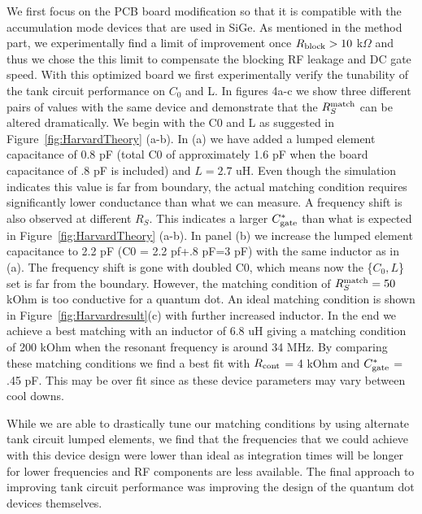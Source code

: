 \documentclass[twocolumn]{article}
\begin{document}
	We first focus on the PCB board modification so that it is compatible with the accumulation mode devices that are used in SiGe. As mentioned in the method part, we experimentally find a limit of improvement once $R_{\rm block}>10$ k$\Omega$ and thus we chose the this limit to compensate the blocking RF leakage and DC gate speed. With this optimized board we first experimentally verify the tunability of the tank circuit performance on $C_0$ and L. In figures 4a-c we show three different pairs of values with the same device and demonstrate that the  $R^{\rm match}_S$ can be altered dramatically. We begin with the C0 and L as suggested in Figure\ \ref{fig:HarvardTheory} (a-b). In (a) we have added a lumped element capacitance of 0.8 pF (total C0 of approximately 1.6 pF when the board capacitance of .8 pF is included) and $L = 2.7$ uH.  Even though the simulation indicates this value is far from boundary, the actual matching condition requires significantly lower conductance than what we can measure. A frequency shift is also observed at different $R_S$. This indicates a larger $C^*_{\rm gate}$ than what is expected in Figure\ \ref{fig:HarvardTheory} (a-b). In panel (b) we increase the lumped element capacitance to 2.2 pF (C0 = 2.2 pf+.8 pF=3 pF) with the same inductor as in (a). The frequency shift is gone with doubled C0, which means now the \{$C_0, L$\} set is far from the boundary. 
	However, the matching condition of  $R^{\rm match}_S = 50$ kOhm is too conductive for a quantum dot. An ideal matching condition is shown in Figure\ \ref{fig:Harvardresult}(c) with further increased inductor. In the end we achieve a best matching with an inductor of 6.8 uH giving a matching condition of 200 kOhm when the resonant frequency is around 34 MHz. By comparing these matching conditions we find a best fit with $R_{\rm cont}$ = 4 kOhm and $C^*_{\rm gate}$ = .45 pF. This may be over fit since as these device parameters may vary between cool downs. %
	
	While we are able to drastically tune our matching conditions by using alternate tank circuit lumped elements, we find that the frequencies that we could achieve with this device design were lower than ideal as integration times will be longer for lower frequencies and RF components are less available. The final approach to improving tank circuit performance was improving the design of the quantum dot devices themselves.  
	
\end{document}
